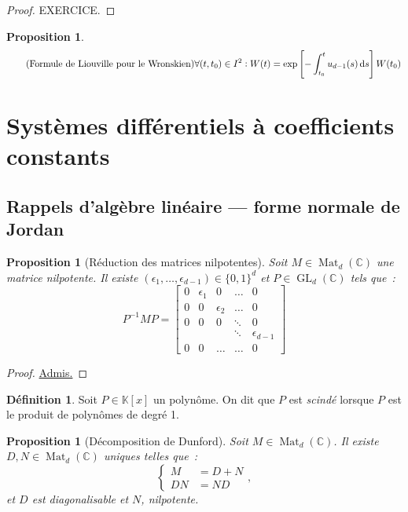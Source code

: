 \documentclass{report}
\newtheorem{prp}[thm]{Proposition}
\theoremstyle{definition}
\newtheorem{déf}[thm]{Définition}
\theoremstyle{remark}
\numberwithin{equation}{section}
\newcommand{\K}{\mathbb K}
\newcommand{\C}{\mathbb C}
\DeclareMathOperator{\Mat}{Mat}
\DeclareMathOperator{\GL}{GL}
\newcommand{\grantedproof}{\begin{proof} \underline{Admis.} \end{proof}}
\begin{document}
			\begin{proof} EXERCICE.
			\end{proof}

			\begin{prp}~
			\begin{align}\tag{Formule de Liouville pour le Wronskien}
				\forall (t, t_0) \in I^2 : W(t) = \exp\left[-\int_{t_0}^tu_{d-1}(s)\dif s\right]W(t_0)
			\end{align}
			\end{prp}

	\section{Systèmes différentiels à coefficients constants}
		\subsection{Rappels d'algèbre linéaire --- forme normale de Jordan}
			\begin{prp}[Réduction des matrices nilpotentes]Soit $M \in \Mat_d(\C)$ une matrice nilpotente. Il existe $(\epsilon_1, \ldots, \epsilon_{d-1}) \in
			\{0, 1\}^d$ et $P \in \GL_d(\C)$ tels que~:
			\begin{equation}
				P^{-1}MP =
			\begin{bmatrix}
				0 & \epsilon_1 & 0 & \ldots & 0 \\
				0 & 0 & \epsilon_2 & \ldots & 0 \\
				0 & 0 & 0		  & \ddots & 0 \\
				  & &   &  \ddots   & \epsilon_{d-1} \\
				0 & 0 & \ldots & \ldots & 0
			\end{bmatrix}
			\end{equation}
			\end{prp}

			\grantedproof

			\begin{déf} Soit $P \in \K[x]$ un polynôme. On dit que $P$ est \textit{scindé} lorsque $P$ est le produit de polynômes de degré 1.
			\end{déf}

			\begin{prp}[Décomposition de Dunford] Soit $M \in \Mat_d(\C)$. Il existe $D, N \in \Mat_d(\C)$ uniques telles que~:
			\begin{equation}
				\begin{cases}M &=D+N \\DN &= ND\end{cases},
			\end{equation}
			et $D$ est diagonalisable et $N$, nilpotente.
			\end{prp}
\end{document}
